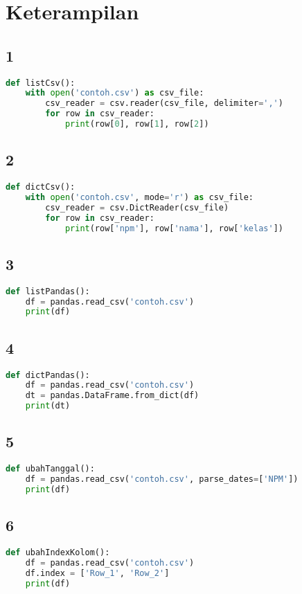 \chapter*{Keterampilan}
\section*{1}
\begin{lstlisting}[language=Python]
def listCsv():
    with open('contoh.csv') as csv_file:
        csv_reader = csv.reader(csv_file, delimiter=',')
        for row in csv_reader:
            print(row[0], row[1], row[2])
\end{lstlisting}
\section*{2}
\begin{lstlisting}[language=Python]
def dictCsv():
    with open('contoh.csv', mode='r') as csv_file:
        csv_reader = csv.DictReader(csv_file)
        for row in csv_reader:
            print(row['npm'], row['nama'], row['kelas'])

\end{lstlisting}
\section*{3}
\begin{lstlisting}[language=Python]
def listPandas():
    df = pandas.read_csv('contoh.csv')
    print(df)
\end{lstlisting}
\section*{4}
\begin{lstlisting}[language=Python]
def dictPandas():
    df = pandas.read_csv('contoh.csv')
    dt = pandas.DataFrame.from_dict(df)
    print(dt)
\end{lstlisting}
\section*{5}
\begin{lstlisting}[language=Python]
def ubahTanggal():
    df = pandas.read_csv('contoh.csv', parse_dates=['NPM'])
    print(df)
\end{lstlisting}
\section*{6}
\begin{lstlisting}[language=Python]
def ubahIndexKolom():
    df = pandas.read_csv('contoh.csv')
    df.index = ['Row_1', 'Row_2']
    print(df)

\end{lstlisting}
